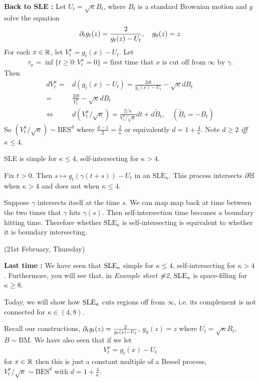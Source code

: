 \documentclass[12pt,a4paper]{article}
\newenvironment{proof}
{\begin{changemargin}{0.5cm}{0.5cm} 
	}%
	{\end{changemargin}
}
\newenvironment{p}
{\begin{proof} 
	}%
	{\end{proof}
}
\begin{document}
\textbf{Back to SLE :} Let $U_t = \sqrt{\kappa} B_t$, where $B_t$ is a standard Brownian motion and $g$ solve the equation
\begin{align*}
\partial_t g_t (z) = \frac{2}{g_t(z) - U_t}, \quad g_0(z) =z
\end{align*}
For each $x\in \mathbb{R}$, let $V_t^x = g_t(x) - U_t$. Let
\begin{align*}
\tau_x = \inf \{ t\geq 0: V_t^x =0\}=\text{first time that } x\text{ is cut off from }\infty \text{ by } \gamma.
\end{align*}
Then
\begin{align*}
dV_t^x =& d(g_t(x) - U_t) = \frac{2dt}{g_t(x) - U_t} - \sqrt{\kappa} dB_t \\
=& \frac{2dt}{V_t^x} - \sqrt{\kappa} dB_t \\
\Leftrightarrow \quad & d(V_t^x / \sqrt{\kappa}) = \frac{2/ \kappa}{V_t^x / \sqrt{\kappa}} dt + d\tilde{B}_t, \quad (\tilde{B}_t = -B_t)
\end{align*}
So $(V_t^x / \sqrt{\kappa}) \sim \text{BES}^d$ where $\frac{d-1}{2} = \frac{2}{\kappa}$ or equivalently $d= 1+ \frac{4}{\kappa}$. Note $d\geq 2$ \emph{iff} $\kappa \leq 4$.
\s

\prop SLE is simple for $\kappa \leq 4$, self-intersecting for $\kappa>4$.
\begin{p}
\pf Fix $t>0$. Then $s\mapsto g_t(\gamma(t+s)) - U_t$ in an $\text{SLE}_{\kappa}$. This process intersects $\partial \mathbb{H}$ when $\kappa >4$ and does not when $\kappa \leq 4$.

\quad Suppose $\gamma$ intersects itself at the time $s$. We can map map back at time between the two times that $\gamma$ hits $\gamma(s)$. Then self-intersection time becomes a boundary hitting time. Therefore whether $\text{SLE}_{\kappa}$ is self-intersecting is equivalent to whether it is boundary intersecting.

\eop
\end{p}
\s

\newday

(21st February, Thursday)
\s

\textbf{Last time :} We have seen that $\text{SLE}_{\kappa}$ simple for $\kappa\leq 4$, self-intersecting for $\kappa>4$. Furthermore, you will see that, in \emph{Example sheet \#2}, $\text{SLE}_{\kappa}$ is space-filling for $\kappa\geq 8$.
\s

Today, we will show how $\text{SLE}_{\kappa}$ cuts regions off from $\infty$, i.e. its complement is not connected for $\kappa \in (4,8)$.
\s

Recall our constructions, $\partial_{t} g_t(z) = \frac{2}{g_t(z) - U_t}$, $g_0(z) =z$ where $U_t = \sqrt{\kappa} B_t$, $B\sim \text{BM}$. We have also seen that if we let
\begin{align*}
V_t^x = g_t(x) - U_t
\end{align*}
for $x\in \mathbb{R}$ then this is just a constant multiple of a Bessel process, $V_t^x /\sqrt{\kappa} \sim \text{BES}^d$ with $d= 1+ \frac{4}{\kappa}$.
\s
\end{document}
